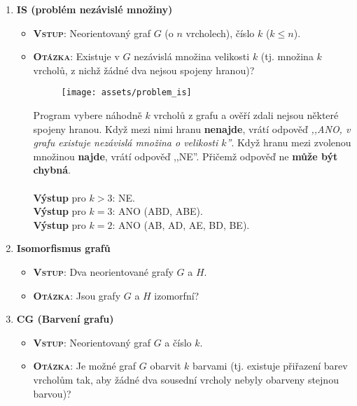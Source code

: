 \begin{enumerate}
    \item \textbf{IS (problém nezávislé množiny)}
          \begin{itemize}
              \item \textbf{\textsc{Vstup}}: Neorientovaný graf $G$ (o $n$ vrcholech), číslo $k$ ($k \leq n$).
              \item \textbf{\textsc{Otázka}}: Existuje v $G$ nezávislá množina velikosti $k$ (tj. množina $k$ vrcholů, z nichž žádné dva nejsou spojeny hranou)?
                    \begin{figure}[H]
                        \centering
                        \texttt{[image: assets/problem\_is]}
                    \end{figure}
                    Program vybere náhodně $k$ vrcholů z grafu a ověří zdali nejsou některé spojeny hranou. Když mezi nimi hranu \textbf{nenajde}, vrátí odpověď \textit{,,ANO, v grafu existuje nezávislá množina o velikosti $k$''}. Když hranu mezi zvolenou množinou \textbf{najde}, vrátí odpověď ,,NE''. Přičemž odpověď ne \textbf{může být chybná}.
                    \\\\
                    \textbf{Výstup} pro $k > 3$: NE.
                    \\
                    \textbf{Výstup} pro $k = 3$: ANO (ABD, ABE).
                    \\
                    \textbf{Výstup} pro $k = 2$: ANO (AB, AD, AE, BD, BE).
          \end{itemize}
    \item \textbf{Isomorfismus grafů}
          \begin{itemize}
              \item \textbf{\textsc{Vstup}}: Dva neorientované grafy $ G $ a $ H $.
              \item \textbf{\textsc{Otázka}}: Jsou grafy $ G $ a $ H $ izomorfní?
          \end{itemize}
    \item \textbf{CG (Barvení grafu)}
          \begin{itemize}
              \item \textbf{\textsc{Vstup}}: Neorientovaný graf $ G $ a číslo $ k $.
              \item \textbf{\textsc{Otázka}}: Je možné graf $ G $ obarvit $ k $ barvami (tj. existuje přiřazení barev vrcholům tak, aby žádné dva sousední vrcholy nebyly obarveny stejnou barvou)?

\end{itemize}
\end{enumerate}

